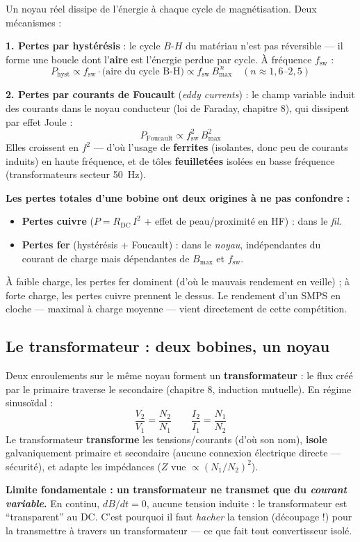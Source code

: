 \documentclass[12pt,a4paper,twoside]{book}
\begin{document}
\begin{formule}
Un noyau réel dissipe de l'énergie à chaque cycle de magnétisation. Deux mécanismes :

\textbf{1. Pertes par hystérésis} : le cycle $B$-$H$ du matériau n'est pas réversible --- il forme une boucle dont l'\textbf{aire} est l'énergie perdue par cycle. À fréquence $f_{\text{sw}}$ :
\[
P_{\text{hyst}} \propto f_{\text{sw}} \cdot \text{(aire du cycle B-H)} \propto f_{\text{sw}}\,B_{\max}^{\,n} \quad (n \approx 1{,}6\text{--}2{,}5)
\]

\textbf{2. Pertes par courants de Foucault} (\textit{eddy currents}) : le champ variable induit des courants dans le noyau conducteur (loi de Faraday, chapitre 8), qui dissipent par effet Joule :
\[
P_{\text{Foucault}} \propto f_{\text{sw}}^2\,B_{\max}^2
\]
Elles croissent en $f^2$ --- d'où l'usage de \textbf{ferrites} (isolantes, donc peu de courants induits) en haute fréquence, et de tôles \textbf{feuilletées} isolées en basse fréquence (transformateurs secteur \SI{50}{Hz}).
\end{formule}

\begin{attention}
\textbf{Les pertes totales d'une bobine ont deux origines à ne pas confondre :}
\begin{itemize}[nosep]
\item \textbf{Pertes cuivre} ($P = R_{\text{DC}}\,I^2$ + effet de peau/proximité en HF) : dans le \textit{fil}.
\item \textbf{Pertes fer} (hystérésis + Foucault) : dans le \textit{noyau}, indépendantes du courant de charge mais dépendantes de $B_{\max}$ et $f_{\text{sw}}$.
\end{itemize}
À faible charge, les pertes fer dominent (d'où le mauvais rendement en veille) ; à forte charge, les pertes cuivre prennent le dessus. Le rendement d'un SMPS en cloche --- maximal à charge moyenne --- vient directement de cette compétition.
\end{attention}

\subsection{Le transformateur : deux bobines, un noyau}

\begin{formule}
Deux enroulements sur le même noyau forment un \textbf{transformateur} : le flux créé par le primaire traverse le secondaire (chapitre 8, induction mutuelle). En régime sinusoïdal :
\[
\frac{V_2}{V_1} = \frac{N_2}{N_1} \qquad \frac{I_2}{I_1} = \frac{N_1}{N_2}
\]
Le transformateur \textbf{transforme} les tensions/courants (d'où son nom), \textbf{isole} galvaniquement primaire et secondaire (aucune connexion électrique directe --- sécurité), et adapte les impédances ($Z$ vue $\propto (N_1/N_2)^2$).

\textbf{Limite fondamentale : un transformateur ne transmet que du \textit{courant variable}.} En continu, $dB/dt = 0$, aucune tension induite : le transformateur est ``transparent'' au DC. C'est pourquoi il faut \textit{hacher} la tension (découpage !) pour la transmettre à travers un transformateur --- ce que fait tout convertisseur isolé.
\end{formule}
\end{document}
